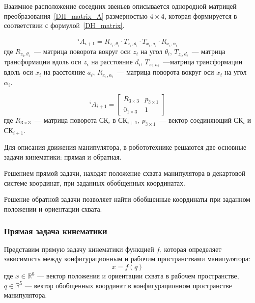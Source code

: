 Взаимное расположение соседних звеньев описывается однородной матрицей преобразования~\eqref{DH_matrix_A} размерностью $4 \times 4$, которая формируется в соответствии с формулой~\eqref{DH_matrix}.

\begin{equation}\label{DH_matrix}
^{i}A_{i+1} = R_{z_i, \theta_i} \cdot T_{z_i, d_i} \cdot T_{x_i, a_i} \cdot R_{x_i, \alpha_i}	
\end{equation}
где $R_{z_i, \theta_i}$~--- матрица поворота вокруг оси $z_i$ на угол $\theta_i$, $T_{z_i, d_i}$~--- матрица трансформации вдоль оси $z_i$ на расстояние $d_i$, $T_{x_i, a_i}$~---матрица трансформации вдоль оси $x_i$ на расстояние $a_i$,  $R_{x_i, \alpha_i}$~--- матрица поворота вокруг оси $x_i$ на угол $\alpha_i$.

\begin{equation}\label{DH_matrix_A}
^{i}A_{i+1} =
\begin{bmatrix}
R_{3 \times 3} & p_{3 \times 1}\\
0_{1 \times 3} & 1
\end{bmatrix}
\end{equation}
где $R_{3 \times 3}$~--- матрица поворота СК$_i$ в СК$_{i+1}$, $p_{3 \times 1}$~--- вектор соединяющий СК$_i$ и СК$_{i+1}$.

Для описания движения манипулятора, в робототехнике решаются две основные задачи кинематики: прямая и обратная.
 
Решением прямой задачи, находят положение схвата манипулятора в декартовой системе координат, при заданных обобщенных координатах.

Решение обратной задачи позволяет найти обобщенные координаты при заданном положении и ориентации схвата.

\subsubsection{Прямая задача кинематики}\label{part_kinematics_forward}

Представим прямую задачу кинематики функцией $f$, которая определяет зависимость между  конфигурационным и рабочим пространствами манипулятора:
\begin{equation}
	x = f(q)
\end{equation}
где $x \in \mathbb{R}^6$ --- вектор положения и ориентации схвата в рабочем пространстве, $q \in \mathbb{R}^5$ --- вектор обобщенных координат в конфигурационном пространстве манипулятора.
\fi

